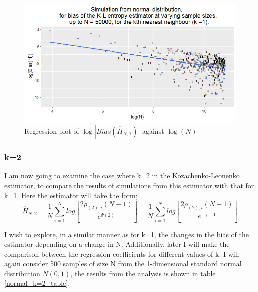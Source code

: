 \documentclass{article}
\begin{document}
\begin{figure}
  \begin{center}
    \includegraphics[width=\textwidth]{./Graphs/Normal_k=1_plot.png}
  \end{center}
\caption{Regression plot of $\log|Bias(\hat{H}_{N, 1})|$ against $\log(N)$}
  \label{normal_k=1_graph}
\end{figure}




\subsubsection{k=2} \label{N_k=2}
I am now going to examine the case where k=2 in the Kozachenko-Leonenko estimator, to compare the results of simulations from this estimator with that for k=1. Here the estimator will take the form;
\begin{equation}
\hat{H}_{N, 2} = \frac{1}{N} \sum_{i=1}^{N} log \left[ \frac{2\rho_{(2),i} (N-1)}{e^{\Psi(2)}} \right] = \frac{1}{N} \sum_{i=1}^{N} log \left[ \frac{2\rho_{(2),i} (N-1)}{e^{-\gamma + 1}} \right] \nonumber
\end{equation}

I wish to explore, in a similar manner as for k=1, the changes in the bias of the estimator depending on a change in N. Additionally, later I will make the comparison between the regression coefficients for different values of k. I will again consider 500 samples of size N from the 1-dimensional standard normal distribution $N(0, 1)$, the results from the analysis is shown in table \ref{normal_k=2_table}.
\end{document}
